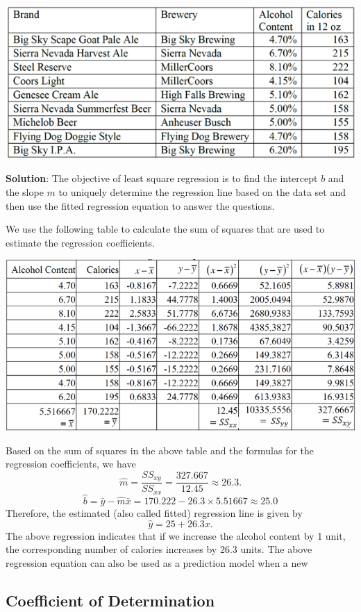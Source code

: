 \documentclass[
]{book}
\begin{document}
\begin{center}\includegraphics[width=0.6\linewidth]{week12/example07Data} \end{center}

\textbf{Solution}: The objective of least square regression is to find the intercept \(b\) and the slope \(m\) to uniquely determine the regression line based on the data set and then use the fitted regression equation to answer the questions.

We use the following table to calculate the sum of squares that are used to estimate the regression coefficients.

\begin{center}\includegraphics[width=0.6\linewidth]{week12/example07Answer} \end{center}

Based on the sum of squares in the above table and the formulas for the regression coefficients, we have
\[
\hat{m} = \frac{SS_{xy}}{SS_{xx}} = \frac{327.667}{12.45} \approx 26.3.
\]
\[
\hat{b} = \bar{y} - \hat{m}\bar{x} = 170.222 -26.3 \times 5.51667 \approx 25.0
\]
Therefore, the estimated (also called fitted) regression line is given by
\[
\hat{y} = 25 + 26.3 x.
\]
The above regression indicates that if we increase the alcohol content by 1 unit, the corresponding number of calories increases by 26.3 units. The above regression equation can also be used as a prediction model when a new

\hypertarget{coefficient-of-determination}{%
\subsection{Coefficient of Determination}\label{coefficient-of-determination}}
\end{document}
